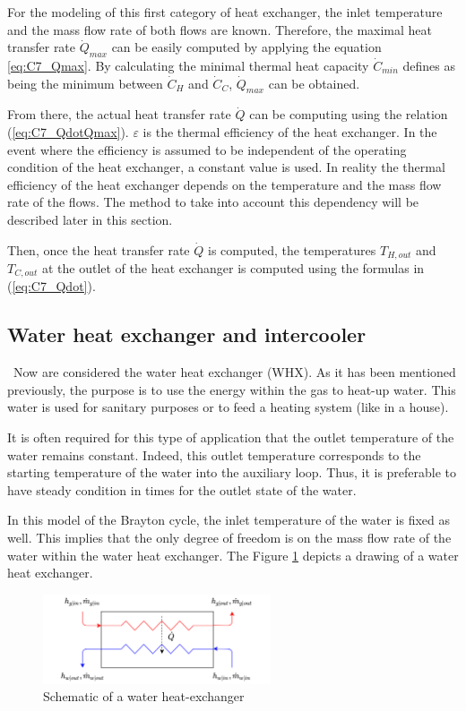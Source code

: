 For the modeling of this first category of heat exchanger, the inlet temperature and the mass flow rate of both flows are known. Therefore, the maximal heat transfer rate  $\dot{Q}_{max}$ can be easily computed by applying the equation \ref{eq:C7_Qmax}. By calculating the minimal thermal heat capacity $\dot{C}_{min}$ defines as being the minimum between $\dot{C}_H$ and $\dot{C}_C$, $\dot{Q}_{max}$ can be obtained.

From there, the actual heat transfer rate $\dot{Q}$ can be computing using the relation (\ref{eq:C7_QdotQmax}). $\varepsilon$ is the thermal efficiency of the heat exchanger. In the event where the efficiency is assumed to be independent of the operating condition of the heat exchanger, a constant value is used. In reality the thermal efficiency of the heat exchanger depends on the temperature and the mass flow rate of the flows. The method to take into account this dependency will be described later in this section.

Then, once the heat transfer rate $\dot{Q}$ is computed, the temperatures $T_{H,out}$ and $T_{C,out}$ at the outlet of the heat exchanger is computed using the formulas in (\ref{eq:C7_Qdot}).

\subsection{Water heat exchanger and intercooler}
\quad\ Now are considered the water heat exchanger (WHX). As it has been mentioned previously, the purpose is to use the energy within the gas to heat-up water. This water is used for sanitary purposes or to feed a heating system (like in a house). 

It is often required for this type of application that the outlet temperature of the water remains constant. Indeed, this outlet temperature corresponds to the starting temperature of the water into the auxiliary loop. Thus, it is preferable to have steady condition in times for the outlet state of the water.

In this model of the Brayton cycle, the inlet temperature of the water is fixed as well. This implies that the only degree of freedom is on the mass flow rate of the water within the water heat exchanger. The Figure \ref{fig:C7_WHX} depicts a drawing of a water heat exchanger.


\begin{figure}[h]
    \centering
    \includegraphics[width=0.6\textwidth]{Chapitre_7/Images/WHX.png}
    \caption{Schematic of a water heat-exchanger}
    \label{fig:C7_WHX}
\end{figure}


